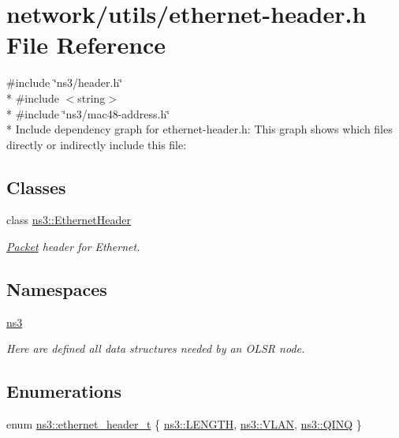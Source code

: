 \hypertarget{ethernet-header_8h}{}\section{network/utils/ethernet-\/header.h File Reference}
\label{ethernet-header_8h}
{\ttfamily \#include \char`\"{}ns3/header.\+h\char`\"{}}\\*
{\ttfamily \#include $<$string$>$}\\*
{\ttfamily \#include \char`\"{}ns3/mac48-\/address.\+h\char`\"{}}\\*
Include dependency graph for ethernet-\/header.h\+:
This graph shows which files directly or indirectly include this file\+:
\subsection*{Classes}
\begin{DoxyCompactItemize}
\item 
class \hyperlink{classns3_1_1EthernetHeader}{ns3\+::\+Ethernet\+Header}
\begin{DoxyCompactList}\small\item\em \hyperlink{classns3_1_1Packet}{Packet} header for Ethernet. \end{DoxyCompactList}\end{DoxyCompactItemize}
\subsection*{Namespaces}
\begin{DoxyCompactItemize}
\item 
 \hyperlink{namespacens3}{ns3}
\begin{DoxyCompactList}\small\item\em Here are defined all data structures needed by an O\+L\+SR node. \end{DoxyCompactList}\end{DoxyCompactItemize}
\subsection*{Enumerations}
\begin{DoxyCompactItemize}
\item 
enum \hyperlink{namespacens3_a484a51f28861c3bf08c3755eca402c4b}{ns3\+::ethernet\+\_\+header\+\_\+t} \{ \hyperlink{namespacens3_a484a51f28861c3bf08c3755eca402c4ba2a8dba1b82ba0a357f4cb543d83f85d5}{ns3\+::\+L\+E\+N\+G\+TH}, 
\hyperlink{namespacens3_a484a51f28861c3bf08c3755eca402c4ba5bf7e6a6a78290ce6c23b470e6c92b3b}{ns3\+::\+V\+L\+AN}, 
\hyperlink{namespacens3_a484a51f28861c3bf08c3755eca402c4bacf54d13b5c9389966dd8e52beb03e498}{ns3\+::\+Q\+I\+NQ}
 \}
\end{DoxyCompactItemize}
